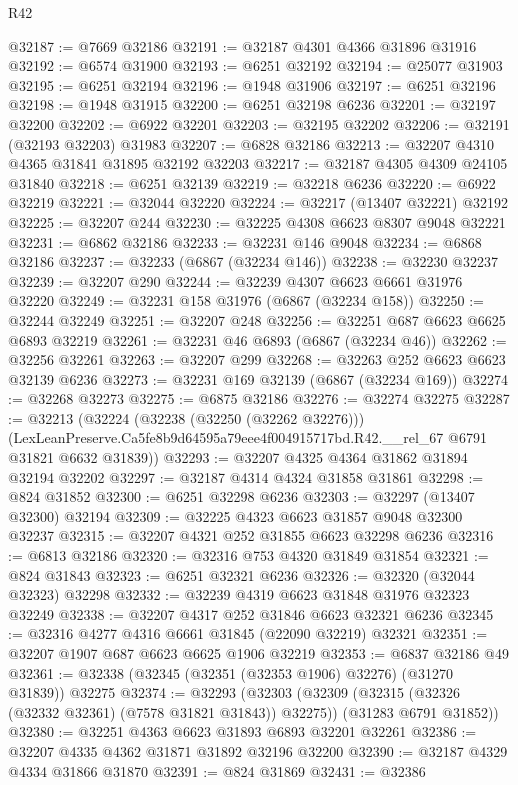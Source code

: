 \begin{lexlean}{R42}
\begin{coremodule}
{@32187 := @7669 @32186
@32191 := @32187 @4301 @4366 @31896 @31916
@32192 := @6574 @31900
@32193 := @6251 @32192
@32194 := @25077 @31903
@32195 := @6251 @32194
@32196 := @1948 @31906
@32197 := @6251 @32196
@32198 := @1948 @31915
@32200 := @6251 @32198 @6236
@32201 := @32197 @32200
@32202 := @6922 @32201
@32203 := @32195 @32202
@32206 := @32191 (@32193 @32203) @31983
@32207 := @6828 @32186
@32213 := @32207 @4310 @4365 @31841 @31895 @32192 @32203
@32217 := @32187 @4305 @4309 @24105 @31840
@32218 := @6251 @32139
@32219 := @32218 @6236
@32220 := @6922 @32219
@32221 := @32044 @32220
@32224 := @32217 (@13407 @32221) @32192
@32225 := @32207 @244
@32230 := @32225 @4308 @6623 @8307 @9048 @32221
@32231 := @6862 @32186
@32233 := @32231 @146 @9048
@32234 := @6868 @32186
@32237 := @32233 (@6867 (@32234 @146))
@32238 := @32230 @32237
@32239 := @32207 @290
@32244 := @32239 @4307 @6623 @6661 @31976 @32220
@32249 := @32231 @158 @31976 (@6867 (@32234 @158))
@32250 := @32244 @32249
@32251 := @32207 @248
@32256 := @32251 @687 @6623 @6625 @6893 @32219
@32261 := @32231 @46 @6893 (@6867 (@32234 @46))
@32262 := @32256 @32261
@32263 := @32207 @299
@32268 := @32263 @252 @6623 @6623 @32139 @6236
@32273 := @32231 @169 @32139 (@6867 (@32234 @169))
@32274 := @32268 @32273
@32275 := @6875 @32186
@32276 := @32274 @32275
@32287 := @32213
    (@32224
      (@32238 (@32250 (@32262 @32276)))
      (LexLeanPreserve.Ca5fe8b9d64595a79eee4f004915717bd.R42.__rel_67 @6791 @31821 @6632 @31839))
@32293 := @32207 @4325 @4364 @31862 @31894 @32194 @32202
@32297 := @32187 @4314 @4324 @31858 @31861
@32298 := @824 @31852
@32300 := @6251 @32298 @6236
@32303 := @32297 (@13407 @32300) @32194
@32309 := @32225 @4323 @6623 @31857 @9048 @32300 @32237
@32315 := @32207 @4321 @252 @31855 @6623 @32298 @6236
@32316 := @6813 @32186
@32320 := @32316 @753 @4320 @31849 @31854
@32321 := @824 @31843
@32323 := @6251 @32321 @6236
@32326 := @32320 (@32044 @32323) @32298
@32332 := @32239 @4319 @6623 @31848 @31976 @32323 @32249
@32338 := @32207 @4317 @252 @31846 @6623 @32321 @6236
@32345 := @32316 @4277 @4316 @6661 @31845 (@22090 @32219) @32321
@32351 := @32207 @1907 @687 @6623 @6625 @1906 @32219
@32353 := @6837 @32186 @49
@32361 := @32338 (@32345 (@32351 (@32353 @1906) @32276) (@31270 @31839)) @32275
@32374 := @32293
    (@32303
      (@32309 (@32315 (@32326 (@32332 @32361) (@7578 @31821 @31843)) @32275))
      (@31283 @6791 @31852))
@32380 := @32251 @4363 @6623 @31893 @6893 @32201 @32261
@32386 := @32207 @4335 @4362 @31871 @31892 @32196 @32200
@32390 := @32187 @4329 @4334 @31866 @31870
@32391 := @824 @31869
@32431 := @32386
}
\end{coremodule}
\end{lexlean}
